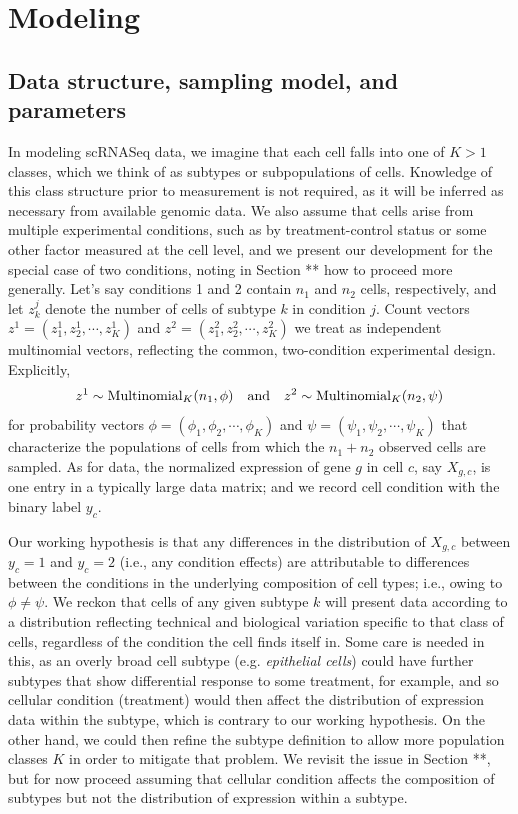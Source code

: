 \documentclass[11pt]{amsart}
\begin{document}
\section{Modeling}
\subsection{Data structure, sampling model, and parameters}
In modeling scRNASeq data, we
imagine that each cell falls into one of $K>1$ classes, which we think of as
subtypes or subpopulations of cells.   Knowledge of this class structure
 prior to measurement is not required, as it will be inferred as necessary from
 available genomic data.  We also assume that cells arise from multiple
experimental conditions, such as by treatment-control status or some other factor
 measured at the cell level, and we present our development for the special
case of two conditions, noting in Section ** how to proceed more generally.
Let's say conditions 1 and 2 contain $n_1$ and $n_2$ cells, respectively, and
let $z^j_k$ denote the number of cells of subtype $k$ in condition $j$.
Count vectors $z^1 = (z^1_1, z^1_2, \cdots, z^1_K )$ and 
$z^2 = (z^2_1, z^2_2, \cdots, z^2_K)$ we treat as independent multinomial
vectors, reflecting the common, two-condition experimental design.
Explicitly,
\begin{eqnarray*}
z^1 \sim \text{Multinomial}_K( n_1, \phi ) \quad {\mbox {\rm and}} \quad
z^2 \sim \text{Multinomial}_K( n_2, \psi )
\end{eqnarray*}
for probability vectors 
$\phi = (\phi_1, \phi_2, \cdots, \phi_K)$ and 
 $\psi = ( \psi_1, \psi_2, \cdots, \psi_K)$ that characterize the populations of
cells from which the $n_1+n_2$ observed cells are sampled.
As for data, the 
normalized expression of gene $g$ in cell $c$, say $X_{g,c}$, is one entry
in a typically large data matrix; and we record cell condition with the binary
label $y_c$.   

Our working hypothesis is that any differences in the distribution of $X_{g,c}$ 
between $y_c=1$ and $y_c=2$ (i.e., any condition effects) are attributable 
to differences between the conditions 
in the underlying composition of cell types; i.e.,
owing to $\phi \neq \psi$.  We reckon that cells of any given subtype $k$ will
present data according to a distribution reflecting technical 
and biological variation specific to that class of cells, regardless of the 
condition the cell finds itself in.   Some care is needed in this, as an overly
broad cell subtype (e.g. {\em epithelial cells}) could have
further subtypes that show differential response to some treatment, for example,
and so cellular condition (treatment) would then affect the distribution of 
expression data within the subtype, which is contrary to our working hypothesis.
On the other hand, we could then refine the subtype definition to allow more
population classes $K$ in order to mitigate that problem.
We revisit the issue in Section **, but for now proceed assuming that cellular 
condition affects the composition of subtypes but not the distribution of expression
within a subtype.
\end{document}

